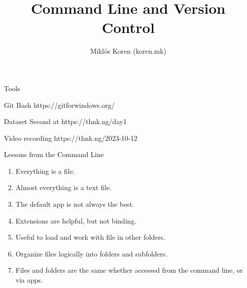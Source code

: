 \documentclass[
  ignorenonframetext,
  aspectratio=54,
]{beamer}
\title{Command Line and Version Control}
\author{Miklós Koren (koren.mk)}
\date{}
\providecommand{\tightlist}{%
  \setlength{\itemsep}{0pt}\setlength{\parskip}{0pt}}
\begin{document}
\frame{\titlepage}

\begin{frame}{Tools}
\protect\hypertarget{tools}{}
\begin{block}{Git Bash}
\protect\hypertarget{git-bash}{}
https://gitforwindows.org/
\end{block}

\begin{block}{Dataset}
\protect\hypertarget{dataset}{}
Second at https://thnk.ng/day1
\end{block}

\begin{block}{Video recording}
\protect\hypertarget{video-recording}{}
https://thnk.ng/2023-10-12
\end{block}
\end{frame}

\begin{frame}{Lessons from the Command Line}
\protect\hypertarget{lessons-from-the-command-line}{}
\begin{enumerate}
\tightlist
\item
  Everything is a file.
\item
  Almost everything is a text file.
\item
  The default app is not always the best.
\item
  Extensions are helpful, but not binding.
\item
  Useful to load and work with file in other folders.
\item
  Organize files logically into folders and subfolders.
\item
  Files and folders are the same whether accessed from the command line,
  or via apps.
\end{enumerate}
\end{frame}
\end{document}
